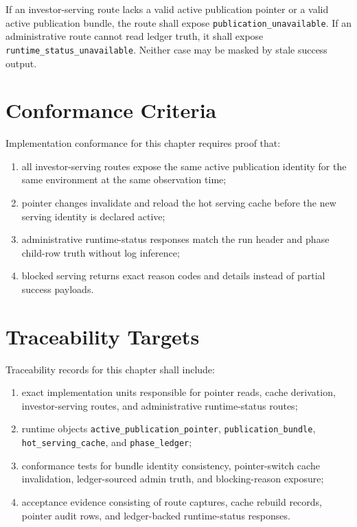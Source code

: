 \documentclass[11pt]{report}
\begin{document}
If an investor-serving route lacks a valid active publication pointer or a valid active publication bundle, the route shall expose \texttt{publication\_unavailable}. If an administrative route cannot read ledger truth, it shall expose \texttt{runtime\_status\_unavailable}. Neither case may be masked by stale success output.

\section{Conformance Criteria}
Implementation conformance for this chapter requires proof that:
\begin{enumerate}[leftmargin=1.2cm]
    \item all investor-serving routes expose the same active publication identity for the same environment at the same observation time;
    \item pointer changes invalidate and reload the hot serving cache before the new serving identity is declared active;
    \item administrative runtime-status responses match the run header and phase child-row truth without log inference;
    \item blocked serving returns exact reason codes and details instead of partial success payloads.
\end{enumerate}

\section{Traceability Targets}
Traceability records for this chapter shall include:
\begin{enumerate}[leftmargin=1.2cm]
    \item exact implementation units responsible for pointer reads, cache derivation, investor-serving routes, and administrative runtime-status routes;
    \item runtime objects \texttt{active\_publication\_pointer}, \texttt{publication\_bundle}, \texttt{hot\_serving\_cache}, and \texttt{phase\_ledger};
    \item conformance tests for bundle identity consistency, pointer-switch cache invalidation, ledger-sourced admin truth, and blocking-reason exposure;
    \item acceptance evidence consisting of route captures, cache rebuild records, pointer audit rows, and ledger-backed runtime-status responses.
\end{enumerate}
\end{document}
